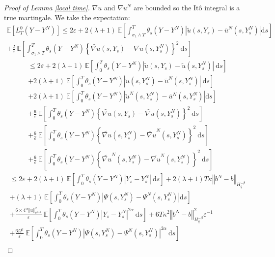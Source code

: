 \documentclass[11pt]{enstaPRE}
\newcommand{\norme}[1]{\left\Vert #1\right\Vert}
\newcommand{\E}{\mathbb{E}}
\newcommand{\di}{\mathrm{d}}
\begin{document}
\begin{proof}[Proof of Lemma \ref{local time}]
    ${\nabla u}$ and ${\nabla u}^N$ are bounded so the Itô integral is a true martingale. We take the expectation:
    \begin{multline*}
    \E\left[L^0_T(Y-Y^N)\right] \leq 2\varepsilon + 2(\lambda + 1)\ \E\left[\int_{\sigma_1\wedge T}^T\theta_s\left(Y-Y^N\right)\left|\widetilde{u}\left(s,Y_s\right)-\overline{u}^N\left(s,Y_s^N\right)\right| \di s \right]\\
    +\frac{2}{\varepsilon}\ \E\left[\int_{\sigma_1\wedge T}^T \theta_s\left(Y-Y^N\right)\left\{\widetilde{\nabla u}\left(s,Y_s\right)-{\overline{\nabla u}}\left(s,Y_s^N\right)\right\}^2\ \di s\right]
    \end{multline*}
    \begin{multline*}
    \leq 2\varepsilon + 2(\lambda + 1)\ \E\left[\int_0^T\theta_s\left(Y-Y^N\right)\left|\widetilde{u}\left(s,Y_s\right)-\widetilde{u}\left(s,Y_s^N\right)\right|\ \di s \right]\\+2(\lambda + 1)\ \E\left[\int_0^T\theta_s\left(Y-Y^N\right)\left|\widetilde{u}\left(s,Y_s^N\right)-\widetilde{u}^N\left(s,Y_s^N\right)\right|\ \di s \right]\\+ 2(\lambda + 1)\ \E\left[\int_{0}^T\theta_s\left(Y-Y^N\right)\left|\widetilde{u}^N\left(s,Y_s^N\right)-\overline{u}^N\left(s,Y_s^N\right)\right| \di s \right]\\
    +\frac{6}{\varepsilon}\ \E\left[\int_0^T \theta_s\left(Y-Y^N\right)\left\{\widetilde{\nabla u}\left(s,Y_s\right)-\widetilde{\nabla u}\left(s,Y_s^N\right)\right\}^2\ \di s\right]\\
    +\frac{6}{\varepsilon}\ \E\left[\int_0^T \theta_s\left(Y-Y^N\right)\left\{\widetilde{\nabla u}\left(s,Y_s^N\right)-\widetilde{\nabla u}^N\left(s,Y_s^N\right)\right\}^2\ \di s\right]\\
    +\frac{6}{\varepsilon}\ \E\left[\int_{0}^T \theta_s\left(Y-Y^N\right)\left\{\widetilde{\nabla u}^N\left(s,Y_s^N\right)-{\overline{\nabla u}^N}\left(s,Y_s^N\right)\right\}^2\ \di s\right]
    \end{multline*}
    \begin{multline*}
    \leq 2\varepsilon + 2(\lambda + 1)\ \E\left[\int_0^T\theta_s\left(Y-Y^N\right)\left|Y_s - Y^N_s\right|\ \di s \right] + 2(\lambda + 1)T\kappa\norme{b^N-b}_{H^{-\beta}_{q}} \\
    + (\lambda + 1)\ \E\left[\int_{0}^T\theta_s\left(Y-Y^N\right)\left|\Psi\left(s,Y_s^N\right)-\Psi^N\left(s,Y_s^N\right)\right| \di s \right]\\  
    +\frac{6\times4^{\alpha}\norme{u}_{\mathcal{C}^{1,\alpha}}^2}{\varepsilon}\ \E\left[\int_0^T \theta_s\left(Y-Y^N\right)\left|Y_s - Y^N_s\right|^{2\alpha}\ \di s\right]  + 6T\kappa^2\norme{b^N-b}_{H^{-\beta}_{q}}^2\varepsilon^{-1} \\+\frac{6\Omega^2}{\varepsilon}\ \E\left[\int_{0}^T \theta_s\left(Y-Y^N\right)\left|\Psi\left(s,Y_s^N\right)-{\Psi^N}\left(s,Y_s^N\right)\right|^{2\alpha}\ \di s\right]\\

\end{multline*}
\end{proof}
\end{document}
